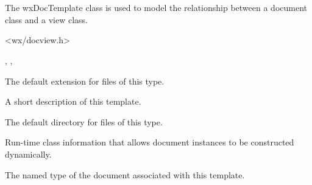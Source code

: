 \section{}\label{wxdoctemplate}

The wxDocTemplate class is used to model the relationship between a
document class and a view class.




<wx/docview.h>




, , 


\label{wxdoctemplatemdefaultext}


The default extension for files of this type.

\label{wxdoctemplatemdescription}


A short description of this template.

\label{wxdoctemplatemdirectory}


The default directory for files of this type.

\label{wxdoctemplatemdocclassinfo}


Run-time class information that allows document instances to be constructed dynamically.

\label{wxdoctemplatemdoctypename}


The named type of the document associated with this template.

\label{wxdoctemplatedocumentmanager}

